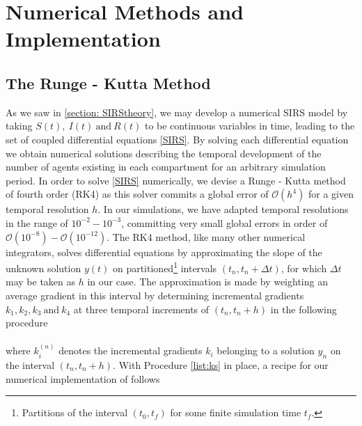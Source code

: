 \section{Numerical Methods and Implementation}
\subsection{The Runge - Kutta Method}
As we saw in \ref{section: SIRStheory}, we may develop a numerical SIRS model by taking $S(t), \ I(t) \ \text{and} \ R(t)$ to be continuous variables in time, leading to the set of coupled differential equations \eqref{SIRS}. By solving each differential equation we obtain numerical solutions describing the temporal development of the number of agents existing in each compartment for an arbitrary simulation period. In order to solve \eqref{SIRS} numerically, we devise a Runge - Kutta method of fourth order (RK4) as this solver commits a global error of $\mathcal{O}(h^4)$ for a given temporal resolution $h$. In our simulations, we have adapted temporal resolutions in the range of $10^{-2} - 10^{-3}$, committing very small global errors in order of $\mathcal{O}(10^{-8}) - \mathcal{O}(10^{-12})$. The RK4 method, like many other numerical integrators, solves differential equations by approximating the slope of the unknown solution $y(t)$ on partitioned\footnote{Partitions of the interval $(t_0, t_f)$ for some finite simulation time $t_f$.} intervals $(t_n, t_n + \Delta t)$, for which $\Delta t$ may be taken as $h$ in our case. The approximation is made by weighting an average gradient in this interval by determining incremental gradients $k_1, k_2,k_3\ \text{and} \ k_4$ at three temporal increments of $(t_n, t_n+h)$ in the following procedure\\
\newline
{}
\newline
\\
where $k^{(n)}_i$ denotes the incremental gradients $k_i$ belonging to a solution $y_n$ on the interval $(t_n, t_n + h)$. With Procedure \ref{list:ks} in place, a recipe for our numerical implementation of follows

